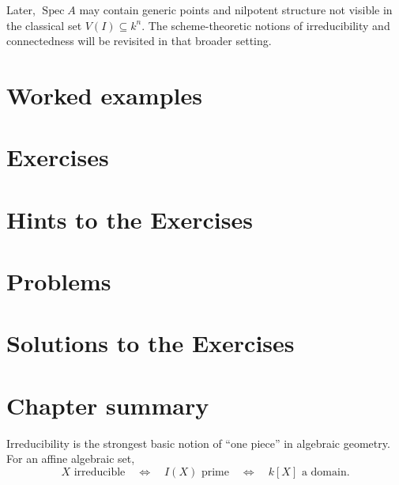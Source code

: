 \begin{warning}
Later, \(\operatorname{Spec}A\) may contain generic points and nilpotent structure not
visible in the classical set \(V(I)\subseteq k^n\).  The scheme-theoretic notions of
irreducibility and connectedness will be revisited in that broader setting.
\end{warning}

\section{Worked examples}


\section{Exercises}


\ifdefined\IncludeExerciseHints
\section{Hints to the Exercises}

\fi

\section{Problems}


\ifdefined\IncludeExerciseSolutions
\section{Solutions to the Exercises}

\fi

\section{Chapter summary}

Irreducibility is the strongest basic notion of ``one piece'' in algebraic geometry.  For
an affine algebraic set,
\[
X\text{ irreducible}
\quad\Longleftrightarrow\quad
I(X)\text{ prime}
\quad\Longleftrightarrow\quad
k[X]\text{ a domain}.
\]

